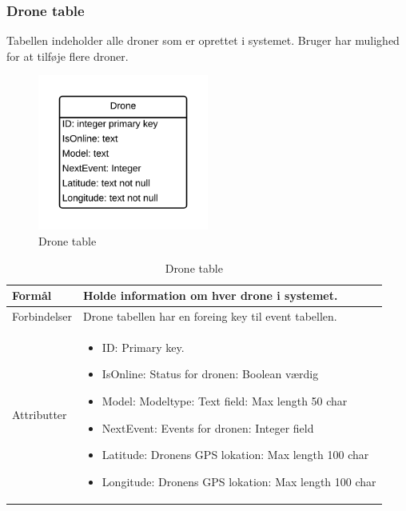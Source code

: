 \subsubsection*{Drone table}
Tabellen indeholder alle droner som er oprettet i systemet. Bruger har mulighed for at tilføje flere droner.
\vspace{-5pt}
\begin{figure}[H]
	\centering
	\includegraphics[width=0.5\textwidth]{Billeder/database/DroneTable.png}
	\vspace{-5pt}
	\caption{Drone table}
	\label{fig:drone_table}
\end{figure}

\begin{table}[H]
\begin{tabular}{| p{3cm}| p{11.5cm}|}
\hline

Formål	 							& Holde information om hver drone i systemet.\\\hline
Forbindelser						& Drone tabellen har en foreing key til event tabellen.\\\hline
Attributter						& \begin{itemize}
												\item ID: Primary key.
												\item IsOnline: Status for dronen: Boolean værdig
												\item Model: Modeltype: Text field: Max length 50 char
												\item NextEvent: Events for dronen: Integer field
												\item Latitude: Dronens GPS lokation: Max length 100 char  
												\item Longitude: Dronens GPS lokation: Max length 100 char
											\end{itemize} \\\hline 
\end{tabular}
\caption{Drone table}
\label{tab:drone_table}
\end{table}